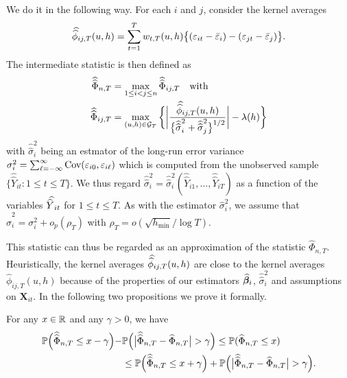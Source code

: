 \documentclass[a4paper,12pt]{article}
\newcommand{\doublehat}[1]{\skew{5.5}\widehat{\widehat{#1}}}
\newcommand{\doublehattwo}[1]{\widehat{\widehat{#1}}}
\begin{document}
We do it in the following way. For each $i$ and $j$, consider the kernel averages
\[\doublehat{\phi}_{ij,T}(u,h) = \sum_{t=1}^T w_{t,T}(u,h) \big\{ (\varepsilon_{it} - \bar{\varepsilon}_i) - (\varepsilon_{jt} - \bar{\varepsilon}_j)  \big\}. \]
The intermediate statistic is then defined as 
\begin{align*}
\doublehattwo{\Phi}_{n,T} &= \max_{1 \le i < j \le n} \doublehattwo{\Phi}_{ij,T}\quad  \text{with} \\
\doublehattwo{\Phi}_{ij,T} &= \max_{(u,h) \in \mathcal{G}_T} \bigg\{ \bigg|\frac{\doublehat{\phi}_{ij,T}(u,h)}{\big\{\doublehattwo{\sigma}_i^2 + \doublehattwo{\sigma}_j^2\big\}^{1/2}}\bigg| - \lambda(h) \bigg\}
\end{align*}
with $\doublehattwo{\sigma}_i^2$ being an estmator of the long-run error variance $\sigma_i^2 = \sum\nolimits_{\ell=-\infty}^{\infty} \textnormal{Cov}(\varepsilon_{i0}, \varepsilon_{i\ell})$ which is computed from the unobserved sample $\{ \doublehattwo{Y}_{it} : 1 \le t \le T \}$. We thus regard $\doublehattwo{\sigma}_i^2 = \doublehattwo{\sigma}_i^2(\doublehattwo{Y}_{i1},\ldots,\doublehattwo{Y}_{iT})$ as a function of the variables $\doublehat{Y}_{it}$ for $1 \le t \le T$. As with the estimator $\widehat{\sigma}_i^2$, we assume that $\doublehattwo{\sigma}_i^2 = \sigma_i^2 + o_p(\rho_T)$ with $\rho_T = o(\sqrt{h_{\min}}/\log T)$. 

This statistic can thus be regarded as an approximation of the statistic $\widehat{\Phi}_{n,T}$. Heuristically, the kernel averages $\doublehat{\phi}_{ij,T}(u,h)$
are close to the kernel averages $\widehat{\phi}_{ij,T}(u,h)$ because of the properties of our estimators $\widehat{\bm{\beta}}_i$, $\doublehattwo{\sigma}_i^2$ and assumptions on $\mathbf{X}_{it}$. In the following two propositions we prove it formally.

\begin{propA}\label{propA-intermediate-relation-1}
For any $x \in \mathbb{R}$ and any $\gamma > 0$, we have
\begin{align}\label{eq-intermediate-relation-1}
\begin{split}\pr\Big(\doublehattwo{\Phi}_{n,T} \le x - \gamma\Big) -& \pr \Big(\big|\doublehattwo{\Phi}_{n,T} - \widehat{\Phi}_{n,T}\big| > \gamma \Big)\le \pr(\widehat{\Phi}_{n, T} \le x) \\
&\le\pr\Big(\doublehattwo{\Phi}_{n,T} \le x + \gamma\Big) + \pr \Big(\big|\doublehattwo{\Phi}_{n,T} - \widehat{\Phi}_{n,T}\big| > \gamma \Big).
\end{split}
\end{align}
\end{propA}
\end{document}
